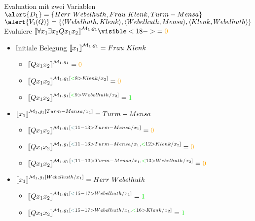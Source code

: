 \begin{frame}
  {Evaluation mit zwei Variablen}
  \onslide<+->
  \onslide<+->\scriptsize
  $\alert{D_1}=\{Herr\ Webelhuth, Frau\ Klenk, Turm-Mensa\}$ \\
  \onslide<+->
  $\alert{V_1(Q)}=\{\tuple{Webelhuth,Klenk},\tuple{Webelhuth,Mensa},\tuple{Klenk,Webelhuth}\}$ \\
  \onslide<+->
  Evaluiere \alert{$\dem{\forall x_1\exists x_2 Qx_1x_2}^{\Model_1,g_1}\visible<18->{=\orongsch{0}}$} \\
  \onslide<+->
  \Zeile
  \begin{minipage}{0.5\textwidth}\begin{itemize}[<+->]
        \item Initiale Belegung ${\llbracket{}x_1\rrbracket}^{\mathcal{M}_1,g_1}=Frau\ Klenk$
          \begin{itemize}[<+->]\scriptsize
            \item $\dem{Qx_1x_2}^{\mMm_1,g_1}=\orongsch{0}$
            \item $\dem{Qx_1x_2}^{\mMm_1,g_1[\gruen<8>{Klenk/x_2}]}=\orongsch{0}$
            \item $\dem{Qx_1x_2}^{\mMm_1,g_1[\gruen<9>{Webelhuth/x_2}]}=\gruen{1}$
          \end{itemize}
        \item ${\llbracket{}x_1\rrbracket}^{\mathcal{M}_1,g_1[Turm-Mensa/x_1]}=Turm-Mensa$
          \begin{itemize}[<+->]\scriptsize
            \item $\dem{Qx_1x_2}^{\mMm_1,g_1[\tuerkis<11-13>{Turm-Mensa/x_1}]}=\orongsch{0}$
            \item $\dem{Qx_1x_2}^{\mMm_1,g_1[\tuerkis<11-13>{Turm-Mensa/x_1},\gruen<12>{Klenk/x_2}]}=\orongsch{0}$
            \item $\dem{Qx_1x_2}^{\mMm_1,g_1[\tuerkis<11-13>{Turm-Mensa/x_1},\gruen<13>{Webelhuth/x_2}]}=\orongsch{0}$ 
          \end{itemize}
        \item $\dem{x_1}^{\Model_1,g_1[Webelhuth/x_1]}=Herr\ Webelhuth$
          \begin{itemize}[<+->]\scriptsize
            \item $\dem{Qx_1x_2}^{\mMm_1,g_1[\tuerkis<15-17>{Webelhuth/x_1}]}=\gruen{1}$
            \item $\dem{Qx_1x_2}^{\mMm_1,g_1[\tuerkis<15-17>{Webelhuth/x_1},\gruen<16>{Klenk/x_2}]}=\gruen{1}$

\end{itemize}
\end{itemize}
\end{minipage}
\end{frame}
